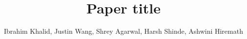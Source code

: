 %
%






\documentclass[journal]{IEEEtran}

\usepackage{xcolor,soul,framed} %

\usepackage[pdftex]{graphicx}
\graphicspath{{../pdf/}{../jpeg/}}

\usepackage[cmex10]{amsmath}
\usepackage{array}
\usepackage{mdwmath}
\usepackage{mdwtab}
\usepackage{eqparbox}
\usepackage{url}





    \title{Paper title}
  \author{
  Ibrahim Khalid,
      Justin Wang,
      Shrey Agarwal,
      Harsh Shinde,
      Ashwini Hiremath
      }





\maketitle



\begin{abstract}
Project abstract here
\end{abstract}

\begin{IEEEkeywords}
Keywords, here
\end{IEEEkeywords}


